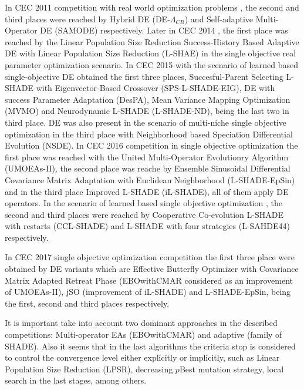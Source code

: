 In CEC 2011 competition with real world optimization problems \cite{CEC2011}, the second and third places were reached by Hybrid DE (DE-$\Lambda_{CR}$) and Self-adaptive Multi-Operator DE (SAMODE) respectively.
%
%
Later in CEC 2014 \cite{CEC2014}, the first place was reached by the Linear Population Size Reduction Success-History Based Adaptive DE with Linear Population Size Reduction (L-SHAE) in the single objective real parameter optimization scenario.
%
In CEC 2015 with the scenario of learned based single-objective \cite{CEC2015} DE obtained the first three places, Succesful-Parent Selecting L-SHADE with Eigenvector-Based Crossover (SPS-L-SHADE-EIG), DE with success Parameter Adaptation (DesPA), Mean Variance Mapping Optimization (MVMO) and Neurodynamic L-SHADE (L-SHADE-ND), being the last two in third place.
%
DE was also present in the scenario of multi-niche single objective optimization in the third place with Neighborhood based Speciation Differential Evolution (NSDE).
%
In CEC 2016 competition in single objective optimization \cite{CEC2015} the first place was reached with the United Multi-Operator Evolutionry Algorithm (UMOEAs-II), the second place was reache by Ensemble Sinusoidal Differential Covariance Matrix Adaptation with Euclidean Neighborhood (L-SHADE-EpSin) and in the third place Improved L-SHADE (iL-SHADE), all of them apply DE operators.
%
In the scenario of learned based single objective optimization \cite{CEC2016_learn}, the second and third places were reached by Cooperative Co-evolution L-SHADE with restarts (CCL-SHADE) and L-SHADE with four strategies (L-SAHDE44) respectively.

In CEC 2017 single objective optimization competition \cite{CEC2017} the first three place were obtained by DE variants which are Effective Butterfly Optimizer with Covariance Matrix Adapted Retreat Phase (EBOwithCMAR considered as an improvement of UMOEAs-II), jSO (improvement of iL-SHADE) and L-SHADE-EpSin, being the first, second and third places respectively.


It is important take into account two dominant approaches in the described competitions: Multi-operator EAs (EBOwithCMAR) and adaptive (family of SHADE).
%
Also it seems that in the last algorithms the criteria stop is considered to control the convergence level either explicitly or implicitly, such as Linear Population Size Reduction (LPSR), decreasing $p$Best mutation strategy, local search in the last stages, among others.
%


